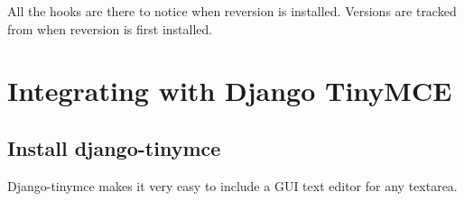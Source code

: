 \documentclass[letterpaper,10pt,english]{manual}
\begin{document}
All the hooks are there to notice when reversion is installed. Versions are tracked from when reversion is first installed.

\resetcurrentobjects
\hypertarget{--doc-integration/tinymce\_integration}{}

\hypertarget{tinymce-integration}{}\section{Integrating with Django TinyMCE}


\subsection{Install django-tinymce}

Django-tinymce makes it very easy to include a GUI text editor for any textarea.
\end{document}

